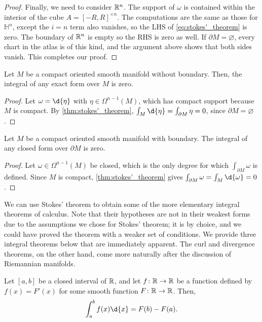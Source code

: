 \documentclass[a4paper,12pt]{article}
\begin{document}
\begin{proof}
    Finally, we need to consider $\mathbb{R}^n$.
    The support of $\omega$ is contained within the interior of the cube $A = [-R, R]^{\times n}$.
    The computations are the same as those for $\mathbb{H}^n$, except the $i = n$ term also vanishes, so the LHS of \eqref{eq:stokes'_theorem} is zero.
    The boundary of $\mathbb{R}^n$ is empty so the RHS is zero as well.
    If $\partial M = \varnothing$, every chart in the atlas is of this kind, and the argument above shows that both sides vanish.
    This completes our proof.
\end{proof}
\begin{corollary}\label{cor:integral_of_exact_form}
    Let $M$ be a compact oriented smooth manifold without boundary.
    Then, the integral of any exact form over $M$ is zero.
\end{corollary}
\begin{proof}
    Let $\omega = \d{\eta}$ with $\eta \in \Omega^{n-1}(M)$, which has compact support because $M$ is compact.
    By \cref{thm:stokes'_theorem}, $\int_M \d{\eta} = \int_{\partial M} \eta = 0$, since $\partial M = \varnothing$.
\end{proof}
\begin{corollary}\label{integral_of_closed_form_over_boundary}
    Let $M$ be a compact oriented smooth manifold with boundary.
    The integral of any closed form over $\partial M$ is zero.
\end{corollary}
\begin{proof}
    Let $\omega \in \Omega^{n-1}(M)$ be closed, which is the only degree for which $\int_{\partial M} \omega$ is defined.
    Since $M$ is compact, \cref{thm:stokes'_theorem} gives $\int_{\partial M} \omega = \int_M \d{\omega} = 0$.
\end{proof}
We can use Stokes' theorem to obtain some of the more elementary integral theorems of calculus.
Note that their hypotheses are not in their weakest forms due to the assumptions we chose for Stokes' theorem; it is by choice, and we could have proved the theorem with a weaker set of conditions.
We provide three integral theorems below that are immediately apparent.
The curl and divergence theorems, on the other hand, come more naturally after the discussion of Riemannian manifolds.
\begin{theorem}\label{thm:fundamental_theorem_of_calculus}
    Let $[a, b]$ be a closed interval of $\mathbb{R}$, and let $f \colon \mathbb{R} \to \mathbb{R}$ be a function defined by $f(x) = F'(x)$ for some smooth function $F \colon \mathbb{R} \to \mathbb{R}$.
    Then,
    \begin{equation}
        \int_a^b f(x) \d{x} = F(b) - F(a).
    \end{equation}
\end{theorem}
\end{document}
